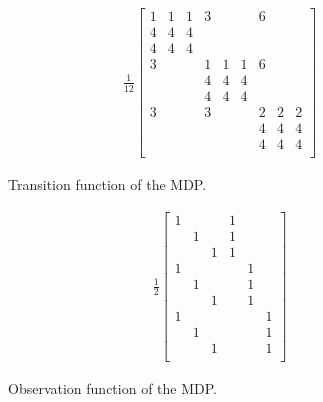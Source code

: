 \begin{subfigure}[b]{0.48\textwidth}
	\begin{align*}
		\frac{1}{12}
		\begin{bmatrix}
			1 & 1 & 1 & 3 &   &   & 6 &   &   \\
			4 & 4 & 4 &   &   &   &   &   &   \\
			4 & 4 & 4 &   &   &   &   &   &   \\
			3 &   &   & 1 & 1 & 1 & 6 &   &   \\
			  &   &   & 4 & 4 & 4 &   &   &   \\
			  &   &   & 4 & 4 & 4 &   &   &   \\
			3 &   &   & 3 &   &   & 2 & 2 & 2 \\
			  &   &   &   &   &   & 4 & 4 & 4 \\
			  &   &   &   &   &   & 4 & 4 & 4 \\
		\end{bmatrix}\end{align*}
	\caption{Transition function of the MDP. }\label{fig:mdp9_transition}
\end{subfigure}
\begin{subfigure}[b]{0.48\textwidth}
	\begin{align*}
		\frac{1}{2}
		\begin{bmatrix}
			1 &   &   & 1 &   &   \\
			  & 1 &   & 1 &   &   \\
			  &   & 1 & 1 &   &   \\
			1 &   &   &   & 1 &   \\
			  & 1 &   &   & 1 &   \\
			  &   & 1 &   & 1 &   \\
			1 &   &   &   &   & 1 \\
			  & 1 &   &   &   & 1 \\
			  &   & 1 &   &   & 1 \\
		\end{bmatrix}
	\end{align*}
	\caption{Observation function of the MDP. }\label{fig:mdp9_observation}
\end{subfigure}

